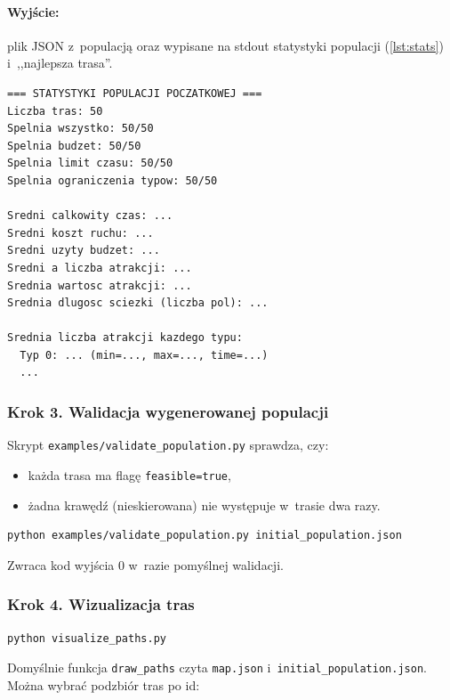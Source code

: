 \paragraph{Wyjście:} plik JSON z~populacją oraz wypisane na stdout
statystyki populacji (\cref{lst:stats}) i~,,najlepsza trasa''.

\begin{lstlisting}[caption={Przykład wyjścia statystyk populacji (\texttt{print\_population\_stats}).},label=lst:stats]
=== STATYSTYKI POPULACJI POCZATKOWEJ ===
Liczba tras: 50
Spelnia wszystko: 50/50
Spelnia budzet: 50/50
Spelnia limit czasu: 50/50
Spelnia ograniczenia typow: 50/50

Sredni calkowity czas: ...
Sredni koszt ruchu: ...
Sredni uzyty budzet: ...
Sredni a liczba atrakcji: ...
Srednia wartosc atrakcji: ...
Srednia dlugosc sciezki (liczba pol): ...

Srednia liczba atrakcji kazdego typu:
  Typ 0: ... (min=..., max=..., time=...)
  ...
\end{lstlisting}

\subsubsection{Krok 3. Walidacja wygenerowanej populacji}

Skrypt \texttt{examples/validate\_population.py} sprawdza, czy:
\begin{itemize}
    \item każda trasa ma flagę \texttt{feasible=true},
    \item żadna krawędź (nieskierowana) nie występuje w~trasie dwa razy.
\end{itemize}

\begin{lstlisting}[language=bash]
python examples/validate_population.py initial_population.json
\end{lstlisting}

Zwraca kod wyjścia 0 w~razie pomyślnej walidacji.

\subsubsection{Krok 4. Wizualizacja tras}

\begin{lstlisting}[language=bash]
python visualize_paths.py
\end{lstlisting}

Domyślnie funkcja \texttt{draw\_paths} czyta \texttt{map.json}
i~\texttt{initial\_population.json}. Można wybrać podzbiór tras po id:

